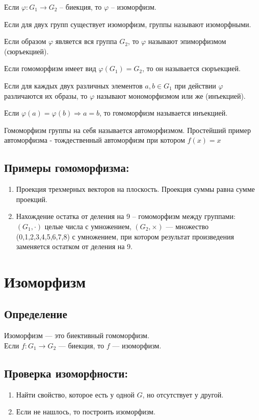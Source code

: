 \documentclass[12pt]{article}
\begin{document}
Если $\varphi:G_1\rightarrow G_2$ -- биекция, то $\varphi$ -- изоморфизм.

Если для двух групп существует изоморфизм, группы называют изоморфными.

Если образом $\varphi$ является вся группа $G_2$, то $\varphi$ называют эпиморфизмом (сюръекцией).

Если гомоморфизм имеет вид $\varphi(G_1)=G_2$, то он называется сюръекцией.

Если для каждых двух различных элементов $a,b\in G_1$ при действии $\varphi$ различаются их образы, то $\varphi$ называют мономорфизмом или же (инъекцией).

Если $\varphi(a)=\varphi(b) \Rightarrow a=b$, то гомоморфизм называется инъекцией.

Гомоморфизм группы на себя называется автоморфизмом. Простейший пример автоморфизма - тождественный автоморфизм при котором $f(x) = x$

\subsection{Примеры гомоморфизма:}
\begin{enumerate}
    \item Проекция трехмерных векторов на плоскость. Проекция суммы равна сумме проекций.

    \item Нахождение остатка от деления на 9 – гомоморфизм между группами: $(G_1,\cdot)$ целые числа с умножением, $(G_2,\times)$ --- множество (0,1,2,3,4,5,6,7,8) с умножением, при котором результат произведения заменяется остатком от деления на 9.
\end{enumerate}

\section{Изоморфизм}
\subsection{Определение}
Изоморфизм --- это биективный гомоморфизм.\\Если $f:G_1\rightarrow G_2$ --- биекция, то $f$ --- изоморфизм.

\subsection{Проверка изоморфности:}
\begin{enumerate}
    \item Найти свойство, которое есть у одной $G$, но отсутствует у другой.
    \item Если не нашлось, то построить изоморфизм.
\end{enumerate}
\end{document}
